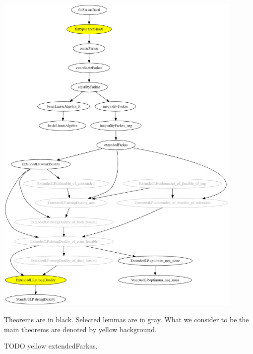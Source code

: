 \documentclass[]{article}
\renewcommand{\.}{\hskip .75pt}
\begin{document}
\includegraphics[width=0.9\textwidth]{theorems.png}

Theorems are in black. Selected lemmas are in gray.
What we consider to be the main theorems are
denoted by yellow background.

TODO yellow extendedFarkas.
\end{document}

